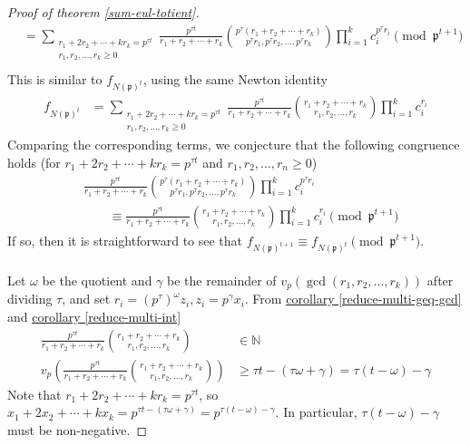 \documentclass{treatise}
\begin{document}
\begin{proof}[Proof of theorem \ref*{sum-eul-totient}]
\begin{align*}
& = \sum_{\substack{r_1 + 2r_2 + \cdots + k r_k = p^{\tau t} \\ r_1, r_2, \hdots, r_k \geq 0}} \frac{p^{\tau t}}{r_1 + r_2 + \cdots + r_k} {p^\tau (r_1 + r_2 + \cdots + r_k) \choose p^\tau r_1, p^\tau r_2, \hdots, p^\tau r_k} \prod_{i = 1}^k c_i^{p^\tau r_i} \pmod{\mathfrak{p}^{t + 1}} \\
\end{align*}
This is similar to $f_{N(\mathfrak{p})^t}$, using the same Newton identity
\begin{align*}
f_{N(\mathfrak{p})^t} & = \sum_{\substack{r_1 + 2r_2 + \cdots + k r_k = p^{\tau t} \\ r_1, r_2, \hdots, r_k \geq 0}} \frac{p^{\tau t}}{r_1 + r_2 + \cdots + r_k} {r_1 + r_2 + \cdots + r_k \choose r_1, r_2, \hdots, r_k} \prod_{i = 1}^k c_i^{r_i}
\end{align*}
Comparing the corresponding terms, we conjecture that the following congruence holds (for $r_1 + 2r_2 + \cdots + k r_k = p^{\tau t}$ and $r_1, r_2, \hdots, r_n \geq 0$)
\begin{align*}
& \frac{p^{\tau t}}{r_1 + r_2 + \cdots + r_k} {p^\tau (r_1 + r_2 + \cdots + r_k) \choose p^\tau r_1, p^\tau r_2, \hdots, p^\tau r_k} \prod_{i = 1}^k c_i^{p^\tau r_i} \nonumber
\\
& \qquad \equiv \frac{p^{\tau t}}{r_1 + r_2 + \cdots + r_k} {r_1 + r_2 + \cdots + r_k \choose r_1, r_2, \hdots, r_k} \prod_{i = 1}^k c_i^{r_i} \pmod{\mathfrak{p}^{t + 1}}
\end{align*}
If so, then it is straightforward to see that $f_{N(\mathfrak{p})^{t + 1}} \equiv f_{N(\mathfrak{p})^t} \pmod{\mathfrak{p}^{t + 1}}$.
\\
\\
Let $\omega$ be the quotient and $\gamma$ be the remainder of $v_p (\gcd(r_1, r_2, \hdots, r_k))$ after dividing $\tau$, and set $r_i = (p^\tau)^\omega z_i, z_i = p^\gamma x_i$. From \hyperref[reduce-multi-geq-gcd]{corollary \ref*{reduce-multi-geq-gcd}} and \hyperref[reduce-multi-int]{corollary \ref*{reduce-multi-int}}
\begin{align*}
\frac{p^{\tau t}}{r_1 + r_2 + \cdots + r_k} {r_1 + r_2 + \cdots + r_k \choose r_1, r_2, \hdots, r_k} & \in \mathbb{N}
\\
v_p \left( \frac{p^{\tau t}}{r_1 + r_2 + \cdots + r_k} {r_1 + r_2 + \cdots + r_k \choose r_1, r_2, \hdots, r_k} \right) & \geq \tau t - (\tau \omega + \gamma) = \tau(t - \omega) - \gamma
\end{align*}
Note that $r_1 + 2r_2 + \cdots + k r_k = p^{\tau t}$, so $x_1 + 2x_2 + \cdots + k x_k = p^{\tau t - (\tau \omega + \gamma)} = p^{\tau (t - \omega) - \gamma}$. In particular, $\tau (t - \omega) - \gamma$ must be non-negative.

\end{proof}
\end{document}
